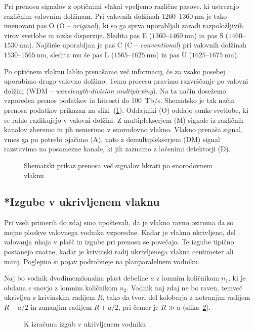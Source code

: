 \begin{remark}
Pri prenosu signalov z optičnimi vlakni vpeljemo različne pasove, ki ustrezajo 
različnim valovnim dolžinam. Pri valovnih dolžinah $1260$--$1360~\si{\nano\meter}$ je tako imenovani
pas O (O -- {\it original}), ki so ga sprva uporabljali zaradi razpoložljivih virov svetlobe
in nizke disperzije. Sledita pas E ($1360$--$1460~\si{\nano\meter}$) in pas S ($1460$--$1530~\si{\nano\meter}$). 
Najširše uporabljan je pas C (C -- {\it conventional}) pri valovnih dolžinah $1530$--$1565~\si{\nano\meter}$,
sledita mu še pas L ($1565$--$1625~\si{\nano\meter}$) in pas U ($1625$--$1675~\si{\nano\meter}$).

Po optičnem vlaknu lahko prenašamo več informacij, če za vsako posebej uporabimo
drugo valovno dolžino. Temu procesu pravimo razvrščanje po valovni dolžini
(WDM -- {\it wavelength-division multiplexing}).
Na ta način dosežemo vzporeden prenos podatkov in hitrosti do 100~Tb/s.
Shematsko je tak način prenosa podatkov prikazan na sliki~(\ref{WDM}).
Oddajniki (O) oddajo sunke svetlobe, ki se rahlo razlikujejo v valovni dolžini. 
Z multiplekserjem (M) signale iz različnih kanalov zberemo in jih usmerimo v 
enorodovno vlakno. Vlakno prenaša signal, vmes ga po potrebi ojačimo (A), 
nato z demultiplekserjem (DM) signal razstavimo na posamezne kanale, ki jih 
zaznamo z ločenimi detektorji (D).
\begin{figure}[h]
\centering
\def\svgwidth{120truemm} 
 
\caption{Shematski prikaz prenosa več signalov hkrati po enorodovnem vlaknu}
\label{WDM}
\end{figure}
\end{remark}

\subsection*{*Izgube v ukrivljenem vlaknu}
Pri vseh primerih do zdaj smo upoštevali, da je vlakno ravno 
oziroma da so mejne ploskve valovnega vodnika vzporedne. 
Kadar je vlakno ukrivljeno, del valovanja uhaja v plašč in 
izgube pri prenosu se povečajo. Te izgube tipično postanejo znatne, 
kadar je krivinski radij ukrivljenega vlakna centimeter ali manj. 
Poglejmo si pojav podrobneje na planparalelnem vodniku.

Naj bo vodnik dvodimenzionalna plast debeline $a$ z lomnim količnikom
$n_{1}$, ki je obdana s snovjo z lomnim količnikom $n_{2}$. Vodnik naj
zdaj ne bo raven, temveč ukrivljen s krivinskim radijem $R$, tako da tvori 
del kolobarja z notranjim radijem $R-a/2$ in zunanjim radijem $R+a/2$, pri 
čemer je $R\gg a$ (slika~\ref{fig:bend}). 
\begin{figure}[h]
\centering
\def\svgwidth{60truemm} 
 
\caption{K izračunu izgub v ukrivljenem vodniku}
\label{fig:bend}
\end{figure}

